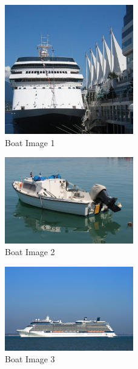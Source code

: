 \begin{figure}[h]
   \centering
   \includegraphics[width=0.5\textwidth]{../test-pictures/boat/boat1.jpg}
   \caption{Boat Image 1}
   \label{fig:boat1}
\end{figure}

\begin{figure}[h]
   \centering
   \includegraphics[width=0.5\textwidth]{../test-pictures/boat/boat2.jpg}
   \caption{Boat Image 2}
   \label{fig:boat2}
\end{figure}

\begin{figure}[h]
   \centering
   \includegraphics[width=0.5\textwidth]{../test-pictures/boat/boat3.jpg}
   \caption{Boat Image 3}
   \label{fig:boat3}
\end{figure}

